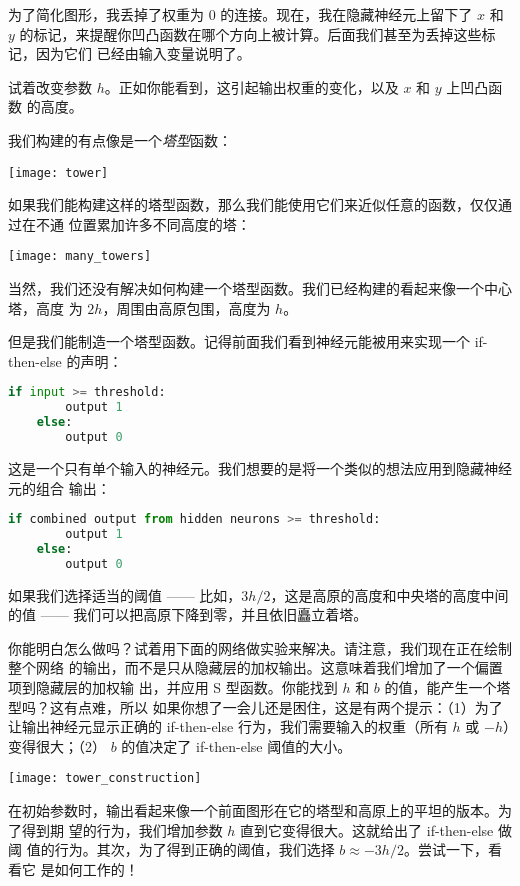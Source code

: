 为了简化图形，我丢掉了权重为 $0$ 的连接。现在，我在隐藏神经元上留下了 $x$ 和 $y$
的标记，来提醒你凹凸函数在哪个方向上被计算。后面我们甚至为丢掉这些标记，因为它们
已经由输入变量说明了。

试着改变参数 $h$。正如你能看到，这引起输出权重的变化，以及 $x$ 和 $y$ 上凹凸函数
的高度。

我们构建的有点像是一个\emph{塔型}函数：
\begin{center}
  \texttt{[image: tower]}
\end{center}

如果我们能构建这样的塔型函数，那么我们能使用它们来近似任意的函数，仅仅通过在不通
位置累加许多不同高度的塔：
\begin{center}
  \texttt{[image: many\_towers]}
\end{center}

当然，我们还没有解决如何构建一个塔型函数。我们已经构建的看起来像一个中心塔，高度
为 $2h$，周围由高原包围，高度为 $h$。

但是我们能制造一个塔型函数。记得前面我们看到神经元能被用来实现一个 {\serif
  if-then-else} 的声明：
\begin{lstlisting}[language=Python]
    if input >= threshold: 
        output 1
    else:
        output 0
\end{lstlisting}

这是一个只有单个输入的神经元。我们想要的是将一个类似的想法应用到隐藏神经元的组合
输出：
\begin{lstlisting}[language=Python]
    if combined output from hidden neurons >= threshold:
        output 1
    else:
        output 0
\end{lstlisting}

如果我们选择适当的阈值 —— 比如，$3h/2$，这是高原的高度和中央塔的高度中间的值 ——
我们可以把高原下降到零，并且依旧矗立着塔。

你能明白怎么做吗？试着用下面的网络做实验来解决。请注意，我们现在正在绘制整个网络
的输出，而不是只从隐藏层的加权输出。这意味着我们增加了一个偏置项到隐藏层的加权输
出，并应用 S 型函数。你能找到 $h$ 和 $b$ 的值，能产生一个塔型吗？这有点难，所以
如果你想了一会儿还是困住，这是有两个提示：（1）为了让输出神经元显示正确的
{\serif if-then-else} 行为，我们需要输入的权重（所有 $h$ 或 $-h$）变得很大；（2）
$b$ 的值决定了 {\serif if-then-else} 阈值的大小。
\begin{center}
  \texttt{[image: tower\_construction]}
\end{center}

在初始参数时，输出看起来像一个前面图形在它的塔型和高原上的平坦的版本。为了得到期
望的行为，我们增加参数 $h$ 直到它变得很大。这就给出了 {\serif if-then-else} 做阈
值的行为。其次，为了得到正确的阈值，我们选择 $b \approx -3h/2$。尝试一下，看看它
是如何工作的！

